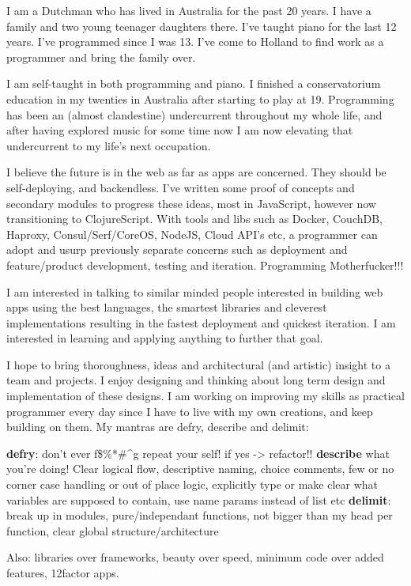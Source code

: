 I am a Dutchman who has lived in Australia for the past 20 years. I have a family and two young teenager daughters there. I've taught piano for the last 12 years. I've programmed since I was 13. I've come to Holland to find work as a programmer and bring the family over. 

I am self-taught in both programming and piano. I finished a conservatorium education in my twenties in Australia after starting to play at 19. Programming has been an (almost clandestine) undercurrent throughout my whole life, and after having explored music for some time now I am now elevating that undercurrent to my life's next occupation. 

I believe the future is in the web as far as apps are concerned. They should be self-deploying, and backendless. I've written some proof of concepts and secondary modules to progress these ideas, most in JavaScript, however now transitioning to ClojureScript. With tools and libs such as Docker, CouchDB, Haproxy, Consul/Serf/CoreOS, NodeJS, Cloud API's  etc, a programmer can adopt and usurp previously separate concerns such as deployment and feature/product development, testing and iteration. Programming Motherfucker!!!

I am interested in talking to similar minded people interested in building web apps using the best languages, the smartest libraries and cleverest implementations resulting in the fastest deployment and quickest iteration. I am interested in learning and applying anything to further that goal. 

I hope to bring thoroughness, ideas and architectural (and artistic) insight to a team and projects. I enjoy designing and thinking about long term design and implementation of these designs. I am working on improving my skills as practical programmer every day since I have to live with my own creations, and keep building on them. My mantras are defry, describe and delimit:

\textbf{defry}: don't ever f\$\%*\#^g repeat your self!
   if yes -> refactor!! 
\textbf{describe} what you're doing!
   Clear logical flow, descriptive naming, choice comments, few or no corner case
   handling or out of place logic, explicitly type or make clear what variables
   are supposed to contain, use name params instead of list etc
\textbf{delimit}: break up in modules, pure/independant functions, not bigger than my head per
function, clear global structure/architecture

Also: libraries over frameworks, beauty over speed, minimum code over added features, 12factor apps.

